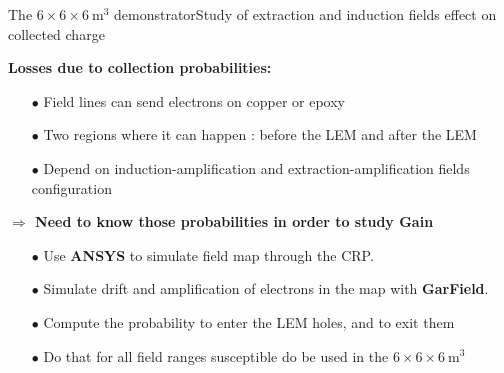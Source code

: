 \documentclass[10pt]{beamer}
\begin{document}
    \begin{frame}{The \texorpdfstring{$6 \times 6 \times \SI{6}{\meter\cubed}$}{666}  demonstrator}{Study of extraction and induction fields effect on collected charge}
    	\begin{scriptsize}
    		\begin{minipage}{0.48\textwidth}
    			\textbf{Losses due to collection probabilities:}
    			\begin{itemize}
    				\item[$\bullet$] Field lines can send electrons on copper or epoxy
    				\item[$\bullet$] Two regions where it can happen : before the LEM and after the LEM
    				\item[$\bullet$] Depend on induction-amplification and extraction-amplification fields configuration
    			\end{itemize}
    			\textbf{$\Rightarrow$ Need to know those probabilities in order to study Gain}
    			\begin{itemize}
    			\item[$\bullet$] Use \textbf{ANSYS} to simulate field map through the CRP.
    			\item[$\bullet$] Simulate drift and amplification of electrons in the map with \textbf{GarField}.
    			\item[$\bullet$] Compute the probability to enter the LEM holes, and to exit them
    			\item[$\bullet$] Do that for all field ranges susceptible do be used in  the $6 \times 6 \times \SI{6}{\meter\cubed}$
	    		\end{itemize}
    		\end{minipage}
    		\begin{minipage}{0.48\textwidth}
    			\centering

\end{minipage}
\end{scriptsize}
\end{frame}
\end{document}
